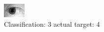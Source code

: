 \begin{figure}[h!]
\begin{center}
\includegraphics[width=0.60\columnwidth]{figures/ID1227_class_3_target_4.png}
\end{center}
\caption{ Classification: 3 actual target: 4}
\label{fig:ID1227_class_3_target_4}
\end{figure}
